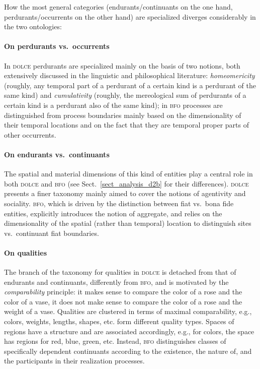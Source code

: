 \documentclass[ao]{iosart2x}
\newcommand{\dolce}{{\textsc{dolce}}}
\newcommand{\bfo}{{\textsc{bfo}}}
\begin{document}
How the most general categories (endurants/continuants on the one hand, perdurants/occurrents on the other hand) are specialized diverges considerably in the two ontologies:

\paragraph{On perdurants vs.~occurrents} In {\dolce} perdurants are specialized mainly on the basis of two notions, both extensively discussed in the linguistic and philosophical literature: \emph{homeomericity} (roughly, any temporal part of a perdurant of a certain kind is a perdurant of the same kind) and \emph{cumulativity} (roughly, the mereological sum of perdurants of a certain kind is a perdurant also of the same kind); in {\bfo} processes are distinguished from process boundaries mainly based on the dimensionality of their temporal locations and on the fact that they are temporal proper parts of other occurrents.

\paragraph{On endurants vs.~continuants} The spatial and material dimensions of this kind of entities play a central role in both {\dolce} and {\bfo} (see Sect.~\ref{sect_analysis_d2b} for their differences). {\dolce} presents a finer taxonomy mainly aimed to cover the notions of agentivity and sociality. {\bfo}, which is driven by the distinction between fiat vs.~bona fide entities, explicitly introduces the notion of aggregate, and relies on the dimensionality of the spatial (rather than temporal) location to distinguish sites vs.~continuant fiat boundaries.

\paragraph{On qualities} The branch of the taxonomy for qualities in {\dolce} is detached from that of endurants and continuants, differently from {\bfo}, and is motivated by the \emph{comparability} principle: it makes sense to compare the color of a rose and the color of a vase, it does not make sense to compare the color of a rose and the weight of a vase. Qualities are clustered in terms of maximal comparability, e.g., colors, weights, lengths, shapes, etc. form different quality types. Spaces of regions have a structure and are associated accordingly, e.g., for colors, the space has regions for red, blue, green, etc. Instead, {\bfo} distinguishes classes of specifically dependent continuants according to the existence, the nature of, and the participants in their realization processes.
\end{document}

